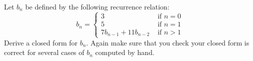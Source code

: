Let $b_n$ be defined by the following recurrence relation:
\[
b_n =
\begin{cases}
3 &\text{ if } n = 0 \\
5 &\text{ if } n = 1 \\
7b_{n-1} + 11b_{n-2} &\text{ if } n > 1
\end{cases}
\]
Derive a closed form for $b_n$.
Again make sure that you check your closed form is
correct for several cases of $b_n$ computed by hand. 
